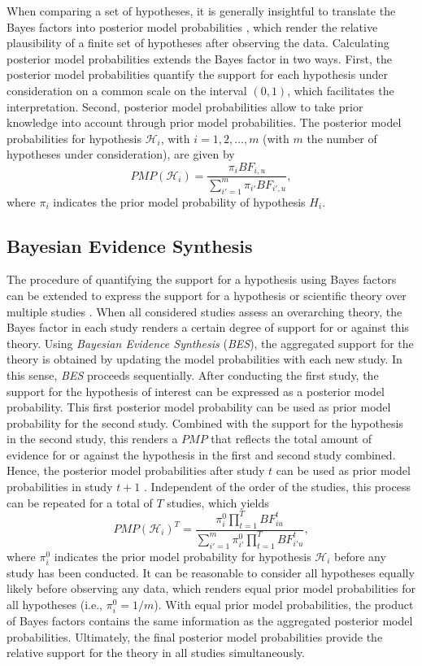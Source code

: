 \documentclass[review, 3p, authoryear]{elsarticle} %
\begin{document}
When comparing a set of hypotheses, it is generally insightful to translate the Bayes factors into posterior model probabilities \citep[\(PMP\)s;][]{kass_raftery_bayes_factors_1995}, which render the relative plausibility of a finite set of hypotheses after observing the data.
Calculating posterior model probabilities extends the Bayes factor in two ways.
First, the posterior model probabilities quantify the support for each hypothesis under consideration on a common scale on the interval \((0,1)\), which facilitates the interpretation.
Second, posterior model probabilities allow to take prior knowledge into account through prior model probabilities.
The posterior model probabilities for hypothesis \(\mathcal{H}_i\), with \(i = 1, 2, \dots, m\) (with \(m\) the number of hypotheses under consideration), are given by
\[
PMP(\mathcal{H}_{i}) = \frac{\pi_i BF_{i,u}}{\sum^m_{i'=1} \pi_{i'} BF_{i',u}}, 
\]
where \(\pi_i\) indicates the prior model probability of hypothesis \(H_i\).

\hypertarget{bayesian-evidence-synthesis}{%
\subsection{Bayesian Evidence Synthesis}\label{bayesian-evidence-synthesis}}

The procedure of quantifying the support for a hypothesis using Bayes factors can be extended to express the support for a hypothesis or scientific theory over multiple studies \citep{kuiper_combining_2013}.
When all considered studies assess an overarching theory, the Bayes factor in each study renders a certain degree of support for or against this theory.
Using \emph{Bayesian Evidence Synthesis} (\emph{BES}), the aggregated support for the theory is obtained by updating the model probabilities with each new study.
In this sense, \emph{BES} proceeds sequentially.
After conducting the first study, the support for the hypothesis of interest can be expressed as a posterior model probability.
This first posterior model probability can be used as prior model probability for the second study.
Combined with the support for the hypothesis in the second study, this renders a \(PMP\) that reflects the total amount of evidence for or against the hypothesis in the first and second study combined.
Hence, the posterior model probabilities after study \(t\) can be used as prior model probabilities in study \(t + 1\) \citep{kuiper_combining_2013}.
Independent of the order of the studies, this process can be repeated for a total of \(T\) studies, which yields
\[
PMP(\mathcal{H}_i)^T = \frac{\pi^0_{i} \prod^T_{t=1} BF^t_{iu}}{\sum^m_{i'=1} \pi^0_{i'} \prod^T_{t=1} BF^t_{i'u}},
\]
where \(\pi^0_i\) indicates the prior model probability for hypothesis \(\mathcal{H}_i\) before any study has been conducted.
It can be reasonable to consider all hypotheses equally likely before observing any data, which renders equal prior model probabilities for all hypotheses (i.e., \(\pi^0_i = 1/m\)).
With equal prior model probabilities, the product of Bayes factors contains the same information as the aggregated posterior model probabilities.
Ultimately, the final posterior model probabilities provide the relative support for the theory in all studies simultaneously.
\end{document}
